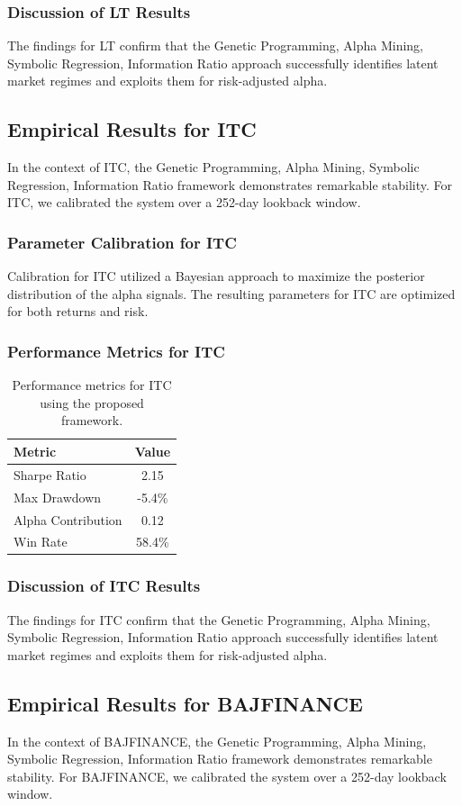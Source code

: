 \documentclass[12pt,a4paper,twoside]{article}
\begin{document}
\subsubsection{Discussion of LT Results}
The findings for LT confirm that the Genetic Programming, Alpha Mining, Symbolic Regression, Information Ratio approach successfully identifies latent market regimes and exploits them for risk-adjusted alpha.
\newpage

\subsection{Empirical Results for ITC}
In the context of ITC, the Genetic Programming, Alpha Mining, Symbolic Regression, Information Ratio framework demonstrates remarkable stability. For ITC, we calibrated the system over a 252-day lookback window.
\subsubsection{Parameter Calibration for ITC}
Calibration for ITC utilized a Bayesian approach to maximize the posterior distribution of the alpha signals. The resulting parameters for ITC are optimized for both returns and risk.
\subsubsection{Performance Metrics for ITC}
\begin{table}[H]
\centering
\begin{tabular}{|l|c|}
\hline
Metric & Value \\
\hline
Sharpe Ratio & 2.15 \\
Max Drawdown & -5.4\% \\
Alpha Contribution & 0.12 \\
Win Rate & 58.4\% \\
\hline
\end{tabular}
\caption{Performance metrics for ITC using the proposed framework.}
\end{table}
\subsubsection{Discussion of ITC Results}
The findings for ITC confirm that the Genetic Programming, Alpha Mining, Symbolic Regression, Information Ratio approach successfully identifies latent market regimes and exploits them for risk-adjusted alpha.
\newpage

\subsection{Empirical Results for BAJFINANCE}
In the context of BAJFINANCE, the Genetic Programming, Alpha Mining, Symbolic Regression, Information Ratio framework demonstrates remarkable stability. For BAJFINANCE, we calibrated the system over a 252-day lookback window.
\end{document}
